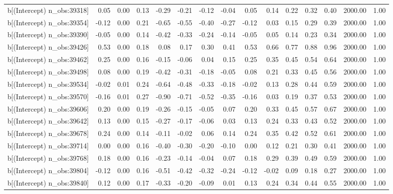 \begin{table}[ht]
\begin{tabular}{rrrrrrrrrrrrrrr}
  b[(Intercept) n\_obs:39318] & 0.05 & 0.00 & 0.13 & -0.29 & -0.21 & -0.12 & -0.04 & 0.05 & 0.14 & 0.22 & 0.32 & 0.40 & 2000.00 & 1.00 \\ 
  b[(Intercept) n\_obs:39354] & -0.12 & 0.00 & 0.21 & -0.65 & -0.55 & -0.40 & -0.27 & -0.12 & 0.03 & 0.15 & 0.29 & 0.39 & 2000.00 & 1.00 \\ 
  b[(Intercept) n\_obs:39390] & -0.05 & 0.00 & 0.14 & -0.42 & -0.33 & -0.24 & -0.14 & -0.05 & 0.05 & 0.14 & 0.23 & 0.34 & 2000.00 & 1.00 \\ 
  b[(Intercept) n\_obs:39426] & 0.53 & 0.00 & 0.18 & 0.08 & 0.17 & 0.30 & 0.41 & 0.53 & 0.66 & 0.77 & 0.88 & 0.96 & 2000.00 & 1.00 \\ 
  b[(Intercept) n\_obs:39462] & 0.25 & 0.00 & 0.16 & -0.15 & -0.06 & 0.04 & 0.15 & 0.25 & 0.35 & 0.45 & 0.54 & 0.64 & 2000.00 & 1.00 \\ 
  b[(Intercept) n\_obs:39498] & 0.08 & 0.00 & 0.19 & -0.42 & -0.31 & -0.18 & -0.05 & 0.08 & 0.21 & 0.33 & 0.45 & 0.56 & 2000.00 & 1.00 \\ 
  b[(Intercept) n\_obs:39534] & -0.02 & 0.01 & 0.24 & -0.64 & -0.48 & -0.33 & -0.18 & -0.02 & 0.13 & 0.28 & 0.44 & 0.59 & 2000.00 & 1.00 \\ 
  b[(Intercept) n\_obs:39570] & -0.16 & 0.01 & 0.27 & -0.90 & -0.71 & -0.52 & -0.35 & -0.16 & 0.03 & 0.19 & 0.37 & 0.53 & 2000.00 & 1.00 \\ 
  b[(Intercept) n\_obs:39606] & 0.20 & 0.00 & 0.19 & -0.26 & -0.15 & -0.05 & 0.07 & 0.20 & 0.33 & 0.45 & 0.57 & 0.67 & 2000.00 & 1.00 \\ 
  b[(Intercept) n\_obs:39642] & 0.13 & 0.00 & 0.15 & -0.27 & -0.17 & -0.06 & 0.03 & 0.13 & 0.24 & 0.33 & 0.43 & 0.52 & 2000.00 & 1.00 \\ 
  b[(Intercept) n\_obs:39678] & 0.24 & 0.00 & 0.14 & -0.11 & -0.02 & 0.06 & 0.14 & 0.24 & 0.35 & 0.42 & 0.52 & 0.61 & 2000.00 & 1.00 \\ 
  b[(Intercept) n\_obs:39714] & 0.00 & 0.00 & 0.16 & -0.40 & -0.30 & -0.20 & -0.10 & 0.00 & 0.12 & 0.21 & 0.30 & 0.41 & 2000.00 & 1.00 \\ 
  b[(Intercept) n\_obs:39768] & 0.18 & 0.00 & 0.16 & -0.23 & -0.14 & -0.04 & 0.07 & 0.18 & 0.29 & 0.39 & 0.49 & 0.59 & 2000.00 & 1.00 \\ 
  b[(Intercept) n\_obs:39804] & -0.12 & 0.00 & 0.16 & -0.51 & -0.42 & -0.32 & -0.24 & -0.12 & -0.02 & 0.09 & 0.18 & 0.27 & 2000.00 & 1.00 \\ 
  b[(Intercept) n\_obs:39840] & 0.12 & 0.00 & 0.17 & -0.33 & -0.20 & -0.09 & 0.01 & 0.13 & 0.24 & 0.34 & 0.44 & 0.55 & 2000.00 & 1.00 \\ 

\end{tabular}
\end{table}
